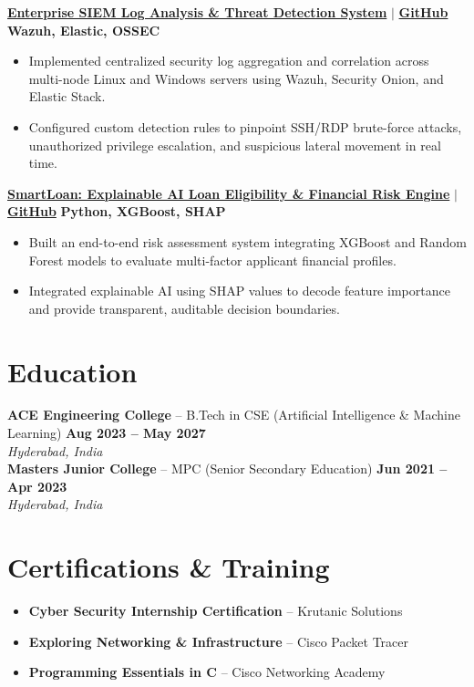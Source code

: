 \documentclass[a4paper,10pt]{article}
\begin{document}
\vspace{2pt}
\noindent\textbf{\href{https://github.com/keerthanreddy08/SIEM-Implementation}{Enterprise SIEM Log Analysis \& Threat Detection System}} $|$ \href{https://github.com/keerthanreddy08/SIEM-Implementation}{\textbf{GitHub}} \hfill \textbf{Wazuh, Elastic, OSSEC}
\begin{itemize}
    \item Implemented centralized security log aggregation and correlation across multi-node Linux and Windows servers using Wazuh, Security Onion, and Elastic Stack.
    \item Configured custom detection rules to pinpoint SSH/RDP brute-force attacks, unauthorized privilege escalation, and suspicious lateral movement in real time.
\end{itemize}

\vspace{2pt}
\noindent\textbf{\href{https://github.com/keerthanreddy08/smartloan}{SmartLoan: Explainable AI Loan Eligibility \& Financial Risk Engine}} $|$ \href{https://github.com/keerthanreddy08/smartloan}{\textbf{GitHub}} \hfill \textbf{Python, XGBoost, SHAP}
\begin{itemize}
    \item Built an end-to-end risk assessment system integrating XGBoost and Random Forest models to evaluate multi-factor applicant financial profiles.
    \item Integrated explainable AI using SHAP values to decode feature importance and provide transparent, auditable decision boundaries.
\end{itemize}

\section{Education}
\noindent\textbf{ACE Engineering College} -- B.Tech in CSE (Artificial Intelligence \& Machine Learning) \hfill \textbf{Aug 2023 -- May 2027}\\
\textit{Hyderabad, India}\\[2pt]
\noindent\textbf{Masters Junior College} -- MPC (Senior Secondary Education) \hfill \textbf{Jun 2021 -- Apr 2023}\\
\textit{Hyderabad, India}

\section{Certifications \& Training}
\begin{itemize}
    \item \textbf{Cyber Security Internship Certification} -- Krutanic Solutions
    \item \textbf{Exploring Networking \& Infrastructure} -- Cisco Packet Tracer
    \item \textbf{Programming Essentials in C} -- Cisco Networking Academy
\end{itemize}
\end{document}
